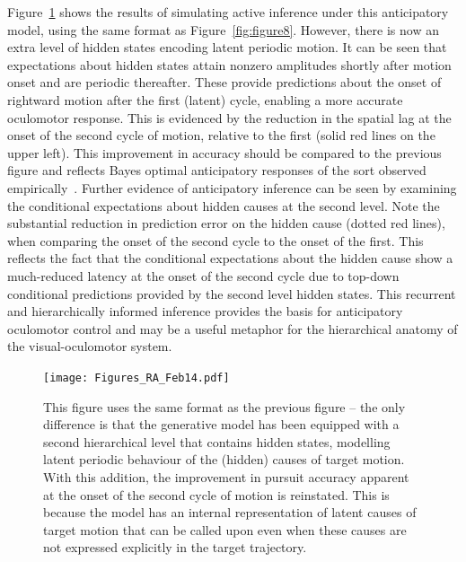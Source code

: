 \documentclass[a4paper]{article} %
\begin{document}
Figure~\ref{fig:figure9} shows the results of simulating active inference under this
anticipatory model, using the same format as Figure~\ref{fig:figure8}. However, there is
now an extra level of hidden states encoding latent periodic motion. It
can be seen that expectations about hidden states attain nonzero
amplitudes shortly after motion onset and are periodic thereafter. These
provide predictions about the onset of rightward motion after the first
(latent) cycle, enabling a more accurate oculomotor response. This is
evidenced by the reduction in the spatial lag at the onset of the second
cycle of motion, relative to the first (solid red lines on the upper
left). This improvement in accuracy should be compared to the previous
figure and reflects Bayes optimal anticipatory responses of the sort
observed empirically~\citep{Barnes00}. Further evidence of
anticipatory inference can be seen by examining the conditional
expectations about hidden causes at the second level. Note the
substantial reduction in prediction error on the hidden cause (dotted
red lines), when comparing the onset of the second cycle to the onset of
the first. This reflects the fact that the conditional expectations
about the hidden cause show a much-reduced latency at the onset of the
second cycle due to top-down conditional predictions provided by the
second level hidden states. This recurrent and hierarchically informed
inference provides the basis for anticipatory oculomotor control and may
be a useful metaphor for the hierarchical anatomy of the
visual-oculomotor system.



\begin{figure}%
 \centerline{%
 \texttt{[image: Figures\_RA\_Feb14.pdf]} %
}%
\caption{This figure uses the same format as the previous
figure -- the only difference is that the generative model has been
equipped with a second hierarchical level that contains hidden states,
modelling latent periodic behaviour of the (hidden) causes of target
motion. With this addition, the improvement in pursuit accuracy apparent
at the onset of the second cycle of motion is reinstated. This is
because the model has an internal representation of latent causes of
target motion that can be called upon even when these causes are not
expressed explicitly in the target trajectory.}%
\label{fig:figure9}
\end{figure}
\end{document}
